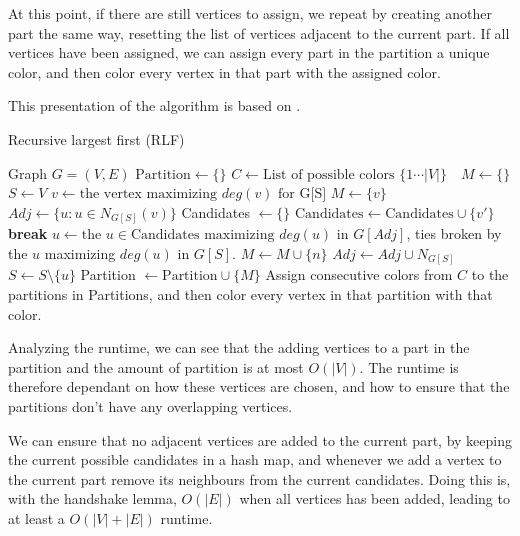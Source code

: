 \documentclass[a4paper]{article}
\newcommand{\algorithmicbreak}{\textbf{break}}
\newcommand{\BREAK}{\STATE \algorithmicbreak}
\begin{document}
At this point, if there are still vertices to assign, we repeat by creating
another part the same way, resetting the list of vertices adjacent to the
current part. If all vertices have been assigned, we can assign every part in
the partition a unique color, and then color every vertex in that part with the
assigned color.

This presentation of the algorithm is based on \cite{Constructive}.
\begin{algorithm}[H]
  \caption{Recursive largest first (RLF)}
  \begin{algorithmic}[1]
      \REQUIRE Graph $G = (V,E)$
      \STATE $\text{Partition} \leftarrow \{\}$
      \STATE $C \leftarrow \text{List of possible colors $\{1 \cdots |V| \}$ }$
      \STATE $M \leftarrow \{\}$
      \STATE $S \leftarrow V$
        \STATE $v \leftarrow \text{the vertex maximizing $deg(v)$ for G[S]} $
        \STATE $M \leftarrow \{v\}$
        \STATE $Adj \leftarrow \{u: u \in N_{G[S]}(v) \}$
            \STATE Candidates $\leftarrow \{\}$
                    \STATE $\text{Candidates} \leftarrow \text{Candidates}
                    \cup \{v'\}$
                \ENDIF
            \ENDFOR
                \BREAK
            \ENDIF
            \STATE $u \leftarrow \text{the $u \in \text{Candidates}$ maximizing $deg(u)$ in $G[Adj]$}$, ties broken by 
            the $u$ maximizing $deg(u)$ in $G[S]$.
            \STATE $M \leftarrow M \cup \{n\}$
            \STATE $Adj \leftarrow Adj \cup N_{G[S]}$
            \STATE $S \leftarrow S \setminus \{u\}$
        \ENDWHILE
        \STATE Partition $\leftarrow \text{Partition} \cup \{M\}$ 
      \ENDWHILE
      \STATE Assign consecutive colors from $C$ to the partitions in Partitions,
      and then color every vertex in that partition with that color.
  \end{algorithmic}
\end{algorithm}

Analyzing the runtime, we can see that the adding vertices to a
part in the partition and the amount of partition is at most $O(|V|)$. The
runtime is therefore dependant on how these vertices are chosen, and how to
ensure that the partitions don't have any overlapping vertices. 

We can ensure
that no adjacent vertices are added to the current part, by keeping the current
possible candidates in a hash map, and whenever we add a vertex to the current
part remove its neighbours from the current candidates. Doing this is, with the
handshake lemma, $O(|E|)$ when all vertices has been added, leading to at least
a $O(|V|+|E|)$ runtime.  
\end{document}
